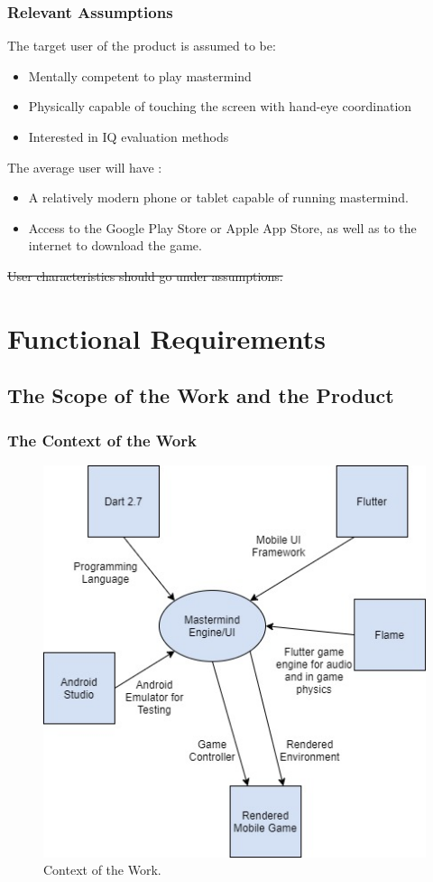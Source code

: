 \documentclass[12pt, titlepage]{article}
\begin{document}
\subsubsection{Relevant Assumptions}
The target user of the product is assumed to be:

\begin{itemize}
    \item Mentally competent to play mastermind
    \item Physically capable of touching the screen with hand-eye coordination
    \item Interested in IQ evaluation methods
\end{itemize}

The average user will have :

\begin{itemize}
    \item A relatively modern phone or tablet capable of running mastermind.
    \item Access to the Google Play Store or Apple App Store, as well as to the internet to download the game.
\end{itemize}

\sout{User characteristics should go under assumptions.}

\section{Functional Requirements}

\subsection{The Scope of the Work and the Product}
\subsubsection{The Context of the Work}
\begin{figure}[H]
   \centering
   \includegraphics[scale=0.5]{context_of_work.jpg}
   \caption{Context of the Work.}
   \label{fig:context_of_work}
 \end{figure}
 
\end{document}
